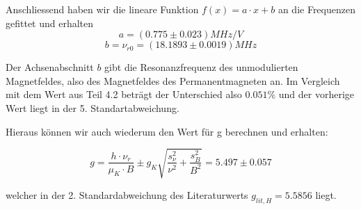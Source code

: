 Anschliessend haben wir die lineare Funktion $f\left( x \right) = a \cdot x + b$ an die Frequenzen gefittet und erhalten
$$ a =   (0.775 \pm 0.023) MHz/V $$
$$ \boxed{b = \nu_{r0} = (18.1893 \pm 0.0019) MHz} $$

Der Achsenabschnitt $b$ gibt die Resonanzfrequenz des unmodulierten Magnetfeldes, also des Magnetfeldes des Permanentmagneten an. Im Vergleich mit dem Wert aus Teil 4.2 beträgt der Unterschied also $0.051\%$ und der vorherige Wert liegt in der 5. Standartabweichung.

Hieraus können wir auch wiederum den Wert für g berechnen und erhalten:

$$ g = \frac{h\cdot\nu_r}{\mu_K\cdot B} \pm g_K\sqrt{\frac{s_\nu^2}{\nu^2} + \frac{s_B^2}{B^2}} = 5.497 \pm 0.057 $$ 

welcher in der 2. Standardabweichung des Literaturwerts $g_{lit,H} = 5.5856$ liegt.






